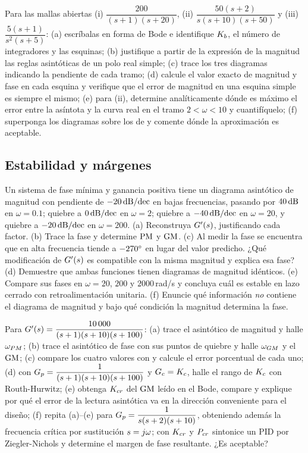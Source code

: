 \begin{problema}\label{prob:rf-7}
Para las mallas abiertas (i) $\dfrac{200}{(s+1)(s+20)}$, (ii) $\dfrac{50(s+2)}{s(s+10)(s+50)}$ y (iii) $\dfrac{5(s+1)}{s^2(s+5)}$:
(a) escríbalas en forma de Bode e identifique $K_b$, el número de integradores y las esquinas;
(b) justifique a partir de la expresión de la magnitud las reglas asintóticas de un polo real simple;
(c) trace los tres diagramas indicando la pendiente de cada tramo;
(d) calcule el valor exacto de magnitud y fase en cada esquina y verifique que el error de magnitud en una esquina simple es siempre el mismo;
(e) para (ii), determine analíticamente dónde es máximo el error entre la asíntota y la curva real en el tramo $2<\omega<10$ y cuantifíquelo;
(f) superponga los diagramas sobre los de  y comente dónde la aproximación es aceptable.
\end{problema}

\subsection*{Estabilidad y márgenes}

\begin{problema}[identificación]\label{prob:rf-8}
Un sistema de fase mínima y ganancia positiva tiene un diagrama asintótico de magnitud con pendiente de $-20\,\mathrm{dB/dec}$ en bajas frecuencias, pasando por $40\,\mathrm{dB}$ en $\omega=0.1$; quiebre a $0\,\mathrm{dB/dec}$ en $\omega=2$; quiebre a $-40\,\mathrm{dB/dec}$ en $\omega=20$, y quiebre a $-20\,\mathrm{dB/dec}$ en $\omega=200$. (a) Reconstruya $G'(s)$, justificando cada factor. (b) Trace la fase y determine $\mathrm{PM}$ y $\mathrm{GM}$. (c) Al medir la fase se encuentra que en alta frecuencia tiende a $-270^{\circ}$ en lugar del valor predicho. ¿Qué modificación de $G'(s)$ es compatible con la misma magnitud y explica esa fase? (d) Demuestre que ambas funciones tienen diagramas de magnitud idénticos. (e) Compare sus fases en $\omega=20$, $200$ y $2000$\,rad/s y concluya cuál es estable en lazo cerrado con retroalimentación unitaria. (f) Enuncie qué información \emph{no} contiene el diagrama de magnitud y bajo qué condición la magnitud determina la fase.
\end{problema}

\begin{problema}\label{prob:rf-9}
Para $G'(s)=\dfrac{10\,000}{(s+1)(s+10)(s+100)}$:
(a) trace el asintótico de magnitud y halle $\omega_{PM}$;
(b) trace el asintótico de fase con sus puntos de quiebre y halle $\omega_{GM}$ y el $\mathrm{GM}$;
(c) compare los cuatro valores con  y calcule el error porcentual de cada uno;
(d) con $G_p=\dfrac{1}{(s+1)(s+10)(s+100)}$ y $G_c=K_c$, halle el rango de $K_c$ con Routh-Hurwitz;
(e) obtenga $K_{cr}$ del $\mathrm{GM}$ leído en el Bode, compare y explique por qué el error de la lectura asintótica va en la dirección conveniente para el diseño;
(f) repita (a)--(e) para $G_p=\dfrac{1}{s(s+2)(s+10)}$, obteniendo además la frecuencia crítica por sustitución $s=j\omega$; con $K_{cr}$ y $P_{cr}$ sintonice un PID por Ziegler-Nichols y determine el margen de fase resultante. ¿Es aceptable?
\end{problema}

